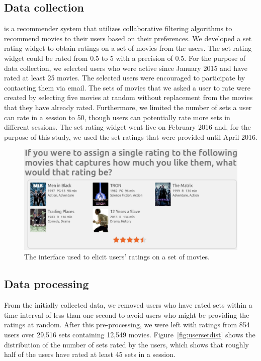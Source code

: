 
\subsection{Data collection}
\ML is a recommender system that utilizes
collaborative filtering algorithms to recommend movies to their users based on
their preferences. We developed a set rating widget to obtain ratings on a set
of movies from the \ML users.  
The set rating widget could be
rated from 0.5 to 5 with a precision of 0.5.  
For the purpose of data collection, we selected users who were active since
January 2015 and have rated at least 25 movies. The selected users were
encouraged to participate by contacting them via email. 
The sets of movies that we asked a user to rate were created by selecting five
movies at random without replacement from the movies that they have already
rated. Furthermore, we limited the number of
sets a user can rate in a session to 50, though users can potentially rate
more sets in different sessions.
The set rating widget went live on February 2016 and, for the purpose of this
study, we used the set ratings that were provided until April 2016.



\begin{figure}[ht]
  \centerline{\includegraphics[scale=0.28]{figures/mlset.pdf}}
  \caption{The interface used to elicit users' ratings on a set of movies.}
  \label{fig:mlset}
\end{figure}

\subsection {Data processing}
From the initially collected data, we removed users who have rated sets within a
time interval of less than one second to avoid users who might be providing
the ratings at random. After this pre-processing, we were left with ratings
from 854 users over 29,516  sets containing 12,549 movies.
Figure~\ref{fig:usersetdist} 
shows the distribution of the number of sets rated by the users,
which shows that roughly half of the users have rated at least 45 sets in a session.


